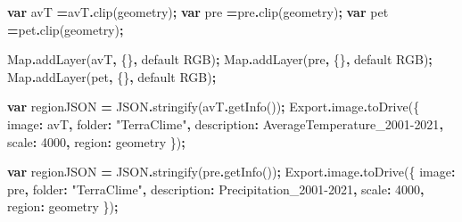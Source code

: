 \documentclass[
  10pt,
  b5paper,
]{book}
\newenvironment{Shaded}{\begin{snugshade}}{\end{snugshade}}
\newcommand{\AttributeTok}[1]{\textcolor[rgb]{0.77,0.63,0.00}{#1}}
\newcommand{\BuiltInTok}[1]{#1}
\newcommand{\DataTypeTok}[1]{\textcolor[rgb]{0.13,0.29,0.53}{#1}}
\newcommand{\DecValTok}[1]{\textcolor[rgb]{0.00,0.00,0.81}{#1}}
\newcommand{\FunctionTok}[1]{\textcolor[rgb]{0.00,0.00,0.00}{#1}}
\newcommand{\KeywordTok}[1]{\textcolor[rgb]{0.13,0.29,0.53}{\textbf{#1}}}
\newcommand{\NormalTok}[1]{#1}
\newcommand{\OperatorTok}[1]{\textcolor[rgb]{0.81,0.36,0.00}{\textbf{#1}}}
\newcommand{\StringTok}[1]{\textcolor[rgb]{0.31,0.60,0.02}{#1}}
\begin{document}
\begin{Shaded}
\begin{Highlighting}[]
\KeywordTok{var}\NormalTok{ avT }\OperatorTok{=}\NormalTok{avT}\OperatorTok{.}\FunctionTok{clip}\NormalTok{(geometry)}\OperatorTok{;}
\KeywordTok{var}\NormalTok{ pre }\OperatorTok{=}\NormalTok{pre}\OperatorTok{.}\FunctionTok{clip}\NormalTok{(geometry)}\OperatorTok{;}
\KeywordTok{var}\NormalTok{ pet }\OperatorTok{=}\NormalTok{pet}\OperatorTok{.}\FunctionTok{clip}\NormalTok{(geometry)}\OperatorTok{;}



\BuiltInTok{Map}\OperatorTok{.}\FunctionTok{addLayer}\NormalTok{(avT}\OperatorTok{,}\NormalTok{ \{\}}\OperatorTok{,} \StringTok{\textquotesingle{}default RGB\textquotesingle{}}\NormalTok{)}\OperatorTok{;}
\BuiltInTok{Map}\OperatorTok{.}\FunctionTok{addLayer}\NormalTok{(pre}\OperatorTok{,}\NormalTok{ \{\}}\OperatorTok{,} \StringTok{\textquotesingle{}default RGB\textquotesingle{}}\NormalTok{)}\OperatorTok{;}
\BuiltInTok{Map}\OperatorTok{.}\FunctionTok{addLayer}\NormalTok{(pet}\OperatorTok{,}\NormalTok{ \{\}}\OperatorTok{,} \StringTok{\textquotesingle{}default RGB\textquotesingle{}}\NormalTok{)}\OperatorTok{;}



\KeywordTok{var}\NormalTok{ regionJSON }\OperatorTok{=} \BuiltInTok{JSON}\OperatorTok{.}\FunctionTok{stringify}\NormalTok{(avT}\OperatorTok{.}\FunctionTok{getInfo}\NormalTok{())}\OperatorTok{;}
\NormalTok{Export}\OperatorTok{.}\AttributeTok{image}\OperatorTok{.}\FunctionTok{toDrive}\NormalTok{(\{}
          \DataTypeTok{image}\OperatorTok{:}\NormalTok{ avT}\OperatorTok{,}
          \DataTypeTok{folder}\OperatorTok{:} \StringTok{"TerraClime"}\OperatorTok{,}
          \DataTypeTok{description}\OperatorTok{:} \StringTok{\textquotesingle{}AverageTemperature\_2001{-}2021\textquotesingle{}}\OperatorTok{,} 
          \DataTypeTok{scale}\OperatorTok{:} \DecValTok{4000}\OperatorTok{,}
          \DataTypeTok{region}\OperatorTok{:}\NormalTok{ geometry}
\NormalTok{\})}\OperatorTok{;}

\KeywordTok{var}\NormalTok{ regionJSON }\OperatorTok{=} \BuiltInTok{JSON}\OperatorTok{.}\FunctionTok{stringify}\NormalTok{(pre}\OperatorTok{.}\FunctionTok{getInfo}\NormalTok{())}\OperatorTok{;}
\NormalTok{Export}\OperatorTok{.}\AttributeTok{image}\OperatorTok{.}\FunctionTok{toDrive}\NormalTok{(\{}
          \DataTypeTok{image}\OperatorTok{:}\NormalTok{ pre}\OperatorTok{,}
          \DataTypeTok{folder}\OperatorTok{:} \StringTok{"TerraClime"}\OperatorTok{,}
          \DataTypeTok{description}\OperatorTok{:} \StringTok{\textquotesingle{}Precipitation\_2001{-}2021\textquotesingle{}}\OperatorTok{,} 
          \DataTypeTok{scale}\OperatorTok{:} \DecValTok{4000}\OperatorTok{,}
          \DataTypeTok{region}\OperatorTok{:}\NormalTok{ geometry}
\NormalTok{\})}\OperatorTok{;}


\end{Highlighting}
\end{Shaded}
\end{document}
